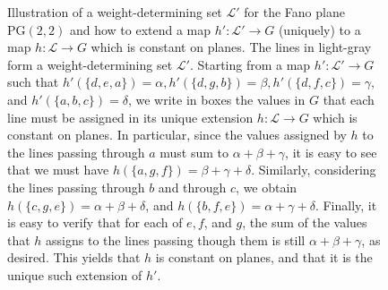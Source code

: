 \documentclass{article}
\theoremstyle{remark}
\theoremstyle{definition}
\begin{document}
\begin{figure}[t]
\begin{center}
\begin{tikzpicture}[scale=1.8]
\end{tikzpicture}
\end{center}
    \caption{Illustration of a weight-determining set $\mathcal{L}'$ for the Fano plane $\mathrm{PG}(2,2)$ and how to extend a map $h':\mathcal{L}'\to G$ (uniquely) to a map $h:\mathcal{L}\to G$ which is constant on planes. The lines in light-gray form a weight-determining set $\mathcal{L}'$. Starting from a map $h':\mathcal{L}'\to G$ such that $h'(\{d, e, a\})=\alpha, h'(\{d, g, b\})=\beta, h'(\{d, f, c\})=\gamma,$ and $h'(\{a,b,c\})=\delta$, we write in boxes the values in $G$ that each line must be assigned in its unique extension $h:\mathcal{L}\to G$ which is constant on planes. In particular, since the values assigned by $h$ to the lines passing through $a$ must sum to $\alpha+\beta+\gamma$, it is easy to see that we must have $h(\{a,g,f\})=\beta+\gamma+\delta$. Similarly, considering the lines passing through $b$ and through $c$, we obtain $h(\{c,g,e\})=\alpha+\beta+\delta$, and $h(\{b,f,e\})=\alpha+\gamma+\delta$. Finally, it is easy to verify that for each of $e, f$, and $g$, the sum of the values that $h$ assigns to the lines passing though them is still $\alpha+\beta+\gamma$, as desired. This yields that $h$ is constant on planes, and that it is the unique such extension of $h'$.
}\label{fig:Fanoplane}
\end{figure}
\end{document}
